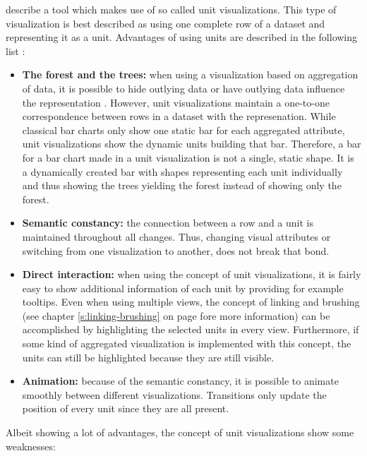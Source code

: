 \citeauthor{Drucker2015} describe a tool which makes use of so called unit visualizations. This type of visualization is best described as using one complete row of a dataset and representing it as a unit. Advantages of using units are described in the following list :
\begin{itemize}
\item \textbf{The forest and the trees:} when using a visualization based on aggregation of data, it is possible to hide outlying data or have outlying data influence the representation . However, unit visualizations maintain a one-to-one correspondence between rows in a dataset with the represenation. While classical bar charts only show one static bar for each aggregated attribute, unit visualizations show the dynamic units building that bar. Therefore, a bar for a bar chart made in a unit visualization is not a single, static shape. It is a dynamically created bar with shapes representing each unit individually and thus showing the trees yielding the forest instead of showing only the forest.

\item \textbf{Semantic constancy:} the connection between a row and a unit is maintained throughout all changes. Thus, changing visual attributes or switching from one visualization to another, does not break that bond.

\item \textbf{Direct interaction:} when using the concept of unit visualizations, it is fairly easy to show additional information of each unit by providing for example tooltips. Even when using multiple views, the concept of linking and brushing (see chapter \ref{s:linking-brushing} on page \pageref{s:linking-brushing} fore more information) can be accomplished by highlighting the selected units in every view. Furthermore, if some kind of aggregated visualization is implemented with this concept, the units can still be highlighted because they are still visible.

\item \textbf{Animation:} because of the semantic constancy, it is possible to animate smoothly between different visualizations. Transitions only update the position of every unit since they are all present.

\end{itemize}

Albeit showing a lot of advantages, the concept of unit visualizations show some weaknesses:

